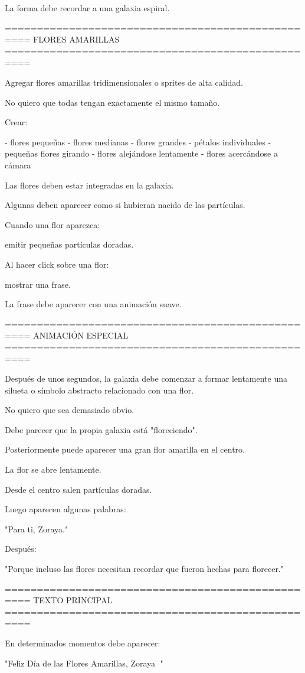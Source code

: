 La forma debe recordar a una galaxia espiral.

==================================================
FLORES AMARILLAS
==================================================

Agregar flores amarillas tridimensionales o sprites de alta calidad.

No quiero que todas tengan exactamente el mismo tamaño.

Crear:

- flores pequeñas
- flores medianas
- flores grandes
- pétalos individuales
- pequeñas flores girando
- flores alejándose lentamente
- flores acercándose a cámara

Las flores deben estar integradas en la galaxia.

Algunas deben aparecer como si hubieran nacido de las partículas.

Cuando una flor aparezca:

emitir pequeñas partículas doradas.

Al hacer click sobre una flor:

mostrar una frase.

La frase debe aparecer con una animación suave.

==================================================
ANIMACIÓN ESPECIAL
==================================================

Después de unos segundos, la galaxia debe comenzar a formar lentamente una silueta o símbolo abstracto relacionado con una flor.

No quiero que sea demasiado obvio.

Debe parecer que la propia galaxia está "floreciendo".

Posteriormente puede aparecer una gran flor amarilla en el centro.

La flor se abre lentamente.

Desde el centro salen partículas doradas.

Luego aparecen algunas palabras:

"Para ti, Zoraya."

Después:

"Porque incluso las flores necesitan recordar que fueron hechas para florecer."

==================================================
TEXTO PRINCIPAL
==================================================

En determinados momentos debe aparecer:

"Feliz Día de las Flores Amarillas, Zoraya 🌻"

